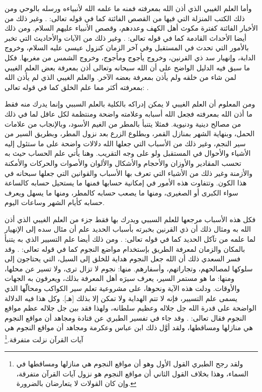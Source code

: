 وأما العلم الغيبي الذي أذن الله بمعرفته فمنه ما علمه الله لأنبياءه ورسله بالوحي ومن ذلك الكتب المنزلة التي فيها من القصص الفائتة كما في قوله تعالى:
\quranayah*[11][49]{\footnotesize \surahname*[11]}. وغير ذلك من الأخبار الفائتة كفترة مكوث أهل الكهف وعددهم، وقصص الأنبياء عليهم السلام. ومن ذلك أيضا الأحداث القادمة كما في قوله تعالى:
\quranayah*[34][3]{\footnotesize \surahname*[34]}. وغير ذلك من الآيات والأحاديث التي تخبر بالأمور التي تحدث في المستقبل وفي آخر الزمان كنزول عيسى عليه السلام، وخروج الدابة، وإنهيار سد ذي القرنين، وخروج يأجوج ومأجوج، وخروج الشمس من مغربها. فكل ما سبق فيه الدليل الواضح على أن الله سبحانه وتعالى أذن بمعرفة بعض العلم الغيبي لمن شاء من خلقه ولم يأذن بمعرفة بعضه الآخر. والعلم الغيبي الذي لم يأذن الله بمعرفته أكثر مما علم الخلق كما في قوله تعالى: 
\quranayah*[17][85]{\footnotesize \surahname*[17]}.

ومن المعلوم أن العلم الغيبي لا يمكن إدراكه بالكلية بالعلم السببي وإنما يدرك منه فقط ما أذن الله بمعرفته فجعل الله أسبابه وعلامته واضحة ومنتظمة لكل عاقل لما في ذلك من مصالح دينية ودنيوية. فمثلا يتنبأ بالمطر من الغيم الأسود، وبالإنجاب من علامات الحمل، وبنهاية الشهر بمنازل القمر، وبطلوع الزرع بعد نزول المطر، وبطريق السير من سير النجم، وغير ذلك من الأسباب التي جعلها الله دلالات واضحة على ما ستئول إليه الأشياء والأحوال في المستقبل ولو على وجه التقريب. وهنا يأتي علم الحساب حيث به تحسب المقادير والأوزان والأحجام والأشكال والألوان والأصوات والحركات والأمكنة والأزمنة وغير ذلك من الأشياء التي تعرف بها الأسباب والقوانين التي جعلها سبحانه في هذا الكون. وتتفاوت هذه الأمور في إمكانية حسابها فمنها ما يستحيل حسابه كالساعة سواء الكبرى أو الصغيرى، ومنها ما يصعب حسابه كالمطر، ومنها ما يسهل ويعرف حسابه كأيام الشهر وساعات اليوم. 

فكل هذه الأسباب مرجعها للعلم السببي ويدرك بها فقط جزء من العلم الغيبي الذي أذن الله به ومثال ذلك أن ذي القرنين بخبرته بأسباب الحديد علم أن مئال سده إلى الإنهيار لما علمه من تآكل الحديد كما في قوله تعالى: 
\quranayah*[18][98]{\footnotesize \surahname*[18]}. ومن ذلك أيضا علم التسيير الذي به يتنبأ بالمكان والزمان لمعرفة الطريق بإستخدام مواضع النجوم كما في قوله تعالى: 
\quranayah*[6][97]{\footnotesize \surahname*[6]}. وقد فسر السعدي ذلك أن الله جعل النجوم هداية للخلق إلى السبل، التي يحتاجون إلى سلوكها لمصالحهم، وتجاراتهم، وأسفارهم. منها: نجوم لا تزال ترى، ولا تسير عن محلها، ومنها: ما هو مستمر السير، يعرف سيرَه أهل المعرفة بذلك، ويعرفون به الجهات والأوقات. ودلت هذه الآية ونحوها، على مشروعية تعلم سير الكواكب ومحالّها الذي يسمى علم التسيير، فإنه لا تتم الهداية ولا تمكن إلا بذلك [هـ]. وكل هذا فيه الدلالة الواضحة على قدرة الله جل جلاله وعظيم سلطانه، ولهذا فقد بين جل جلاله عظم مواقع النجوم فقال تعالى:  
\quranayah*[56][75-76]{\footnotesize \surahname*[56]}. وقد جاء في تفسير الطبري عن قتادة ومجاهد أن مواقع النجوم هي منازلها ومساقطها، ولقد أوَّل ذلك ابن عباس وعكرمة ومجاهد أن مواقع النجوم هي آيات القرآن نزلت متفرقة.\footnote{ولقد رجح الطبري القول الأول وهو أن مواقع النجوم هي منازلها ومساقطها في السماء، وهذا بخلاف القول الثاني أن مواقع النجوم هو نزول آيات القرآن متفرقة، وإن كان القولات لا يتعارضان بالضرورة.}

